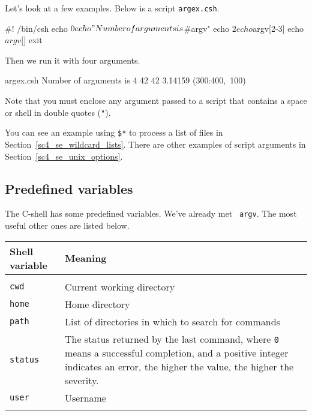 \documentclass[twoside,11pt,nolof]{starlink}
\providecommand{\latexelsehtml}[2]{#1}
\begin{document}
Let's look at a few examples.  Below is a script \texttt{argex.csh}.
\begin{small}
\begin{terminalv}
     #! /bin/csh
     echo ${0}
     echo "Number of arguments is $#argv"
     echo $2
     echo $argv[2-3]
     echo $argv[$]
     exit
\end{terminalv}
\end{small}
Then we run it with four arguments.

\begin{small}
\begin{terminalv}
     argex.csh
     Number of arguments is 4
     42
     42 3.14159
     (300:400,~100)
\end{terminalv}
\end{small}
Note that you must enclose any argument passed to a script that contains
a space or shell  in double quotes ({\texttt{"}}).

You can see an example using \texttt{\$*} to process a list of files
\latexelsehtml{in Section~\ref{sc4_se_wildcard_lists}.
}{\htmlref{here}{sc4_se_wildcard_lists}.}  There are other examples of script
arguments in \latexelsehtml{Section~\ref{sc4_se_unix_options}.
}{\htmlref{UNIX options}{sc4_se_unix_options}.}

\subsection{Predefined variables
\label{sc4_se_predefined}}

The C-shell has some predefined variables.  We've already met {\tt
argv}.  The most useful other ones are listed below.

\begin{center}
\begin{tabular}{lp{100mm}}
Shell variable & Meaning \\ \hline
\\
\texttt{cwd}      & Current working directory \\
\texttt{home}     & Home directory \\
\texttt{path}     & List of directories in which to search for commands \\
\texttt{status}   & The status returned by the last command, where \texttt{0}
                 means a successful completion, and a positive integer
                 indicates an error, the higher the value, the higher
                 the severity. \\
\texttt{user}     & Username \\
\\ \hline
\end{tabular}
\end{center}
\end{document}
